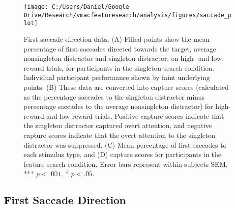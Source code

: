 \documentclass[man, a4paper, noextraspace, 11pt,floatsintext]{apa6}
\theoremstyle{definition}
\theoremstyle{definition}
\theoremstyle{definition}
\theoremstyle{remark}
\begin{document}
\begin{figure}[!h]

{\centering \texttt{[image: C:/Users/Daniel/Google Drive/Research/vmacfeaturesearch/analysis/figures/saccade\_plot]} 

}

\caption{First saccade direction data. (A) Filled points show
the mean percentage of first saccades directed towards the target,
average nonsingleton distractor and singleton distractor, on high- and
low-reward trials, for participants in the singleton search condition.
Individual participant performance shown by faint underlying points. (B)
These data are converted into capture scores (calculated as the
percentage saccades to the singleton distractor minus percentage
saccades to the average nonsingleton distractor) for high-reward and
low-reward trials. Positive capture scores indicate that the singleton
distractor captured overt attention, and negative capture scores
indicate that the overt attention to the singleton distractor was
suppressed. (C) Mean percentage of first saccades to each stimulus type,
and (D) capture scores for participants in the feature search condition.
Error bars represent within-subjects SEM. *** \(p<.001\), * \(p<.05\).}\label{fig:SaccadePlot}
\end{figure}

\subsection{First Saccade Direction}\label{first-saccade-direction}
\end{document}
